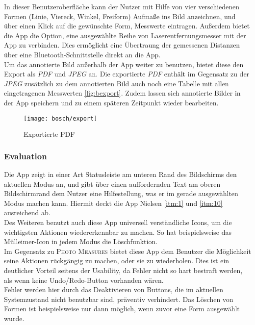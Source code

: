 In dieser Benutzeroberfläche kann der Nutzer mit Hilfe von vier verschiedenen Formen (Linie, Viereck, Winkel, Freiform) Aufmaße ins Bild anzeichnen, und über einen Klick auf die gewünschte Form, Messwerte eintragen.
Außerdem bietet die App die Option, eine ausgewählte Reihe von Laserentfernungsmesser mit der App zu verbinden.
Dies ermöglicht eine Übertraung der gemessenen Distanzen über eine Bluetooth-Schnittstelle direkt an die App. \\

Um das annotierte Bild außerhalb der App weiter zu benutzen, bietet diese den Export als \emph{PDF} und \emph{JPEG} an.
Die exportierte \emph{PDF} enthält im Gegensatz zu der \emph{JPEG} zusätzlich zu dem annotierten Bild auch noch eine Tabelle mit allen eingetragenen Messwerten \autoref{fig:bexport}. 
Zudem lassen sich annotierte Bilder in der App speichern und zu einem späteren Zeitpunkt wieder bearbeiten.

\begin{figure}[h]
  \centering
  \texttt{[image: bosch/export]}
  \caption{Exportierte PDF}
  \label{fig:bexport}
\end{figure}

\subsubsection{Evaluation}

Die App zeigt in einer Art Statusleiste am unteren Rand des Bildschirms den aktuellen Modus an, und gibt über einen auffordernden Text am oberen Bildschirmrand dem Nutzer eine Hilfestellung, was er im gerade ausgewählten Modus machen kann.  Hiermit deckt die App Nielsen \ref{itm:1} und \ref{itm:10} ausreichend ab. \\

Des Weiteren benutzt auch diese App universell verständliche Icons, um die wichtigsten Aktionen wiedererkennbar zu machen. So hat beispielsweise das Mülleimer-Icon in jedem Modus die Löschfunktion. \\

Im Gegensatz zu \textsc{Photo Measures} bietet diese App dem Benutzer die Möglichkeit seine Aktionen rückgängig zu machen, oder sie zu wiederholen. Dies ist ein deutlicher Vorteil seitens der Usability, da Fehler nicht so hart bestraft werden, als wenn keine Undo/Redo-Button vorhanden wären. \\

Fehler werden hier durch das Deaktivieren von Buttons, die im aktuellen Systemzustand nicht benutzbar sind, präventiv verhindert. Das Löschen von Formen ist beispielsweise nur dann möglich, wenn zuvor eine Form ausgewählt wurde.

